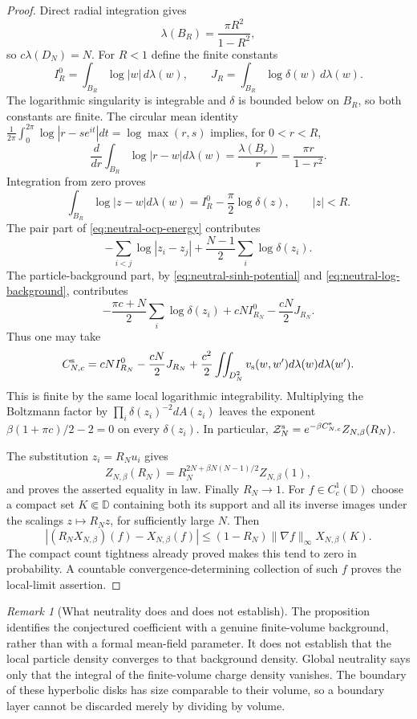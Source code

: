 \documentclass[11pt,a4paper]{article}
\numberwithin{equation}{section}
\theoremstyle{definition}
\theoremstyle{remark}
\newtheorem{remark}[theorem]{Remark}
\begin{document}
\begin{proof}
Direct radial integration gives
\[
 \lambda(B_R)=\frac{\pi R^2}{1-R^2},
\]
so $c\lambda(D_N)=N$.  For $R<1$ define the finite constants
\[
 I_R^0=\int_{B_R}\log|w|\,d\lambda(w),\qquad
 J_R=\int_{B_R}\log\delta(w)\,d\lambda(w).
\]
The logarithmic singularity is integrable and $\delta$ is bounded below
on $B_R$, so both constants are finite.  The circular mean identity
$\frac1{2\pi}\int_0^{2\pi}\log|r-se^{it}|dt=\log\max(r,s)$
implies, for $0<r<R$,
\[
 \frac{d}{dr}\int_{B_R}\log|r-w|d\lambda(w)
 =\frac{\lambda(B_r)}{r}
 =\frac{\pi r}{1-r^2}.
\]
Integration from zero proves
\begin{equation}
 \int_{B_R}\log|z-w|d\lambda(w)
 =I_R^0-\frac\pi2\log\delta(z),\qquad |z|<R.
 \label{eq:neutral-log-background}
\end{equation}
The pair part of \eqref{eq:neutral-ocp-energy} contributes
\[
 -\sum_{i<j}\log|z_i-z_j|
 +\frac{N-1}{2}\sum_i\log\delta(z_i).
\]
The particle-background part, by
\eqref{eq:neutral-sinh-potential} and
\eqref{eq:neutral-log-background}, contributes
\[
 -\frac{\pi c+N}{2}\sum_i\log\delta(z_i)
 +cNI_{R_N}^0-\frac{cN}{2}J_{R_N}.
\]
Thus one may take
\[
 C_{N,c}^{\rm s}
 =cNI_{R_N}^0-\frac{cN}{2}J_{R_N}
 +\frac{c^2}{2}\iint_{D_N^2}v_{\rm s}(w,w')
                                      d\lambda(w)d\lambda(w').
\]
This is finite by the same local logarithmic integrability.
Multiplying the Boltzmann factor by
$\prod_i\delta(z_i)^{-2}dA(z_i)$ leaves the exponent
$\beta(1+\pi c)/2-2=0$ on every $\delta(z_i)$.
In particular,
$\mathcal Z_N^{\rm s}=e^{-\beta C_{N,c}^{\rm s}}Z_{N,\beta}(R_N)$.

The substitution $z_i=R_Nu_i$ gives
\[
 Z_{N,\beta}(R_N)
 =R_N^{2N+\beta N(N-1)/2}Z_{N,\beta}(1),
\]
and proves the asserted equality in law.  Finally $R_N\to1$.
For $f\in C_c^1(\mathbb D)$ choose a compact set $K\Subset\mathbb D$
containing both its support and all its inverse images under the
scalings $z\mapsto R_Nz$, for sufficiently large $N$.
Then
\[
 |(R_NX_{N,\beta})(f)-X_{N,\beta}(f)|
 \le (1-R_N)\|\nabla f\|_\infty X_{N,\beta}(K).
\]
The compact count tightness already proved makes this tend to zero in
probability.  A countable convergence-determining collection of such
$f$ proves the local-limit assertion.
\end{proof}

\begin{remark}[What neutrality does and does not establish]
The proposition identifies the conjectured coefficient with a genuine
finite-volume background, rather than with a formal mean-field
parameter.  It does not establish that the local particle density
converges to that background density.  Global neutrality says only that
the integral of the finite-volume charge density vanishes.  The boundary
of these hyperbolic disks has size comparable to their volume, so a
boundary layer cannot be discarded merely by dividing by volume.
\end{remark}
\end{document}
